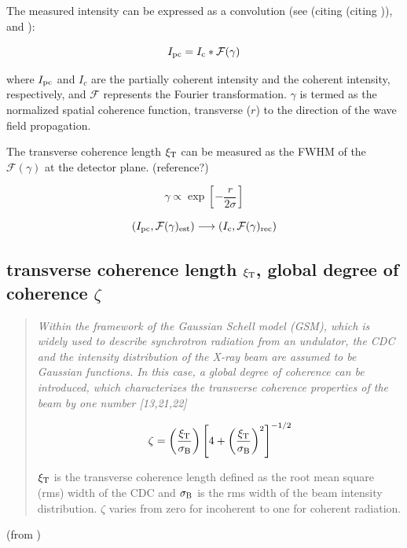 \documentclass{article}
\newcommand{\mathup}[1]{\text{\textup{#1}}}
\newenvironment{itquotation}
{\begin{quotation}\itshape}
	{\end{quotation}}
\begin{document}
The measured intensity can be expressed as a convolution (see \cite[(eq.33)]{VartanyantsRobinson2001} \cite[(eq.23)]{WilliamsQuineyPeeleEtAl2007} (citing \cite{LinPatersonPeeleEtAl2003} (citing \cite{Nugent1991})), \cite[(eq.1)]{WhiteheadWilliamsQuineyEtAl2009} and \cite[(eq.5)]{ClarkHuangHarderEtAl2012}):

\[I_{\mathup{pc}} = I_\mathup{c} \ast \mathcal{F}(\gamma)\]

where $I_{\mathup{pc}}$ and $I_c$ are the partially coherent intensity and the coherent intensity, respectively, and $\mathcal{F}$ represents the Fourier transformation. $\gamma$ is termed as the normalized spatial coherence function, transverse ($r$) to the direction of the wave field propagation.

The transverse coherence length $\xi_\mathup{T}$ can be measured as the FWHM of the $\mathcal{F}(\gamma)$ at the detector plane. (reference?) 

\[\gamma \propto \exp\!\left[-\frac{r}{2\sigma}\right]\]


\[\left( I_{\mathup{pc}},\mathcal{F}(\gamma)_{\mathup{est}}\right)  \longrightarrow \left( I_\mathup{c}, \mathcal{F}(\gamma)_{\mathup{rec}} \right)  \]


\subsection{transverse coherence length $\xi_\mathup{T}$, global degree of coherence $\zeta$}

\begin{itquotation}
   Within the framework of the Gaussian Schell model (GSM), which is widely used to describe synchrotron radiation from an undulator, the CDC and the intensity distribution of the X-ray beam are assumed to be Gaussian functions. In this case, a global degree of coherence can be introduced, which characterizes the transverse coherence properties of the beam by one number [13,21,22] \cite{SingerSorgenfreiMancusoEtAl2012}

\[
\zeta = \left( \frac{\xi_\mathup{T}}{\sigma_\mathup{B}} \right) \left[ 4 + \left( \frac{\xi_\mathup{T}}{\sigma_\mathup{B}} \right)^2 \right]^{-1/2}
\]

$\xi_\mathup{T}$ is the transverse coherence length defined as the root mean square (rms) width of the CDC and $\sigma_\mathup{B}$ is the rms width of the beam intensity distribution. $\zeta$ varies from zero for incoherent to one for coherent radiation. 
\end{itquotation}
\begin{flushright}
	(from \cite[eq.5]{BagschikFroemterMuellerEtAl2016a})
\end{flushright}
\end{document}
